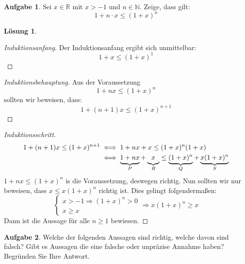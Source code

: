 \documentclass{article}
\theoremstyle{definition}
\newtheorem{ub}{Aufgabe}
\newtheorem*{lo*}{Lösung}
\begin{document}
\newpage
\begin{ub}
	Sei $ x \in \mathbb{R} $  mit $ x > -1 $ und  $ n \in \mathbb{N} $. Zeige, dass gilt:
	\[ 
	1 + n \cdot x \leq (1+x)^n
	 \]
\end{ub}
\begin{tcolorbox}
	\begin{lo*}
		\begin{proof}[Induktionsanfang]
			Der Induktionsanfang ergibt sich unmittelbar:
			\[ 
			1 + x \leq (1 + x)^1
			 \]
		\end{proof}
		\begin{proof}[Induktionsbehauptung]\renewcommand{\qedsymbol}{}
			Aus der Voraussetzung
			\[ 
			1 + nx \leq (1+x)^n
			 \]
			 sollten wir beweisen, dass:
			\[ 
			1 + (n+1)x \leq (1+x)^{n+1}
			 \]\noindent
		\end{proof}
		\begin{proof}[Induktionsschritt]
			\begin{align*}
				1 + (n+1)x \leq (1+x)^{n+1} & \iff 1 + nx + x \leq (1+x)^n(1+x) \\
				& \iff \underbrace{\vphantom{(}1 + nx}_{P} + \underbrace{\vphantom{()} x}_{R} \leq \underbrace{(1+x)^n}_{Q} + \underbrace{x(1+x)^n}_{S}
			\end{align*}
		$ 1 + nx \leq (1+x)^n $ is die Voraussetzung, deswegen richtig. Nun sollten wir nur beweisen, dass $ x \leq x(1+x)^{n} $ richtig ist. Dies gelingt folgendermaßen:
		\[ 
		\left\{
		\begin{array}{ll}
			x > -1 \Rightarrow (1+x)^n > 0 \\
			x \geq x
		\end{array} \Rightarrow x(1+x)^n \geq x
		\right.
		 \]
		Dann ist die Aussage für alle $ n \geq 1 $ bewiesen.
		\end{proof}
	\end{lo*}
\end{tcolorbox}
\newpage
\begin{ub}
	 Welche der folgenden Aussagen sind richtig, welche davon sind falsch? Gibt es
	Aussagen die eine falsche oder unpräzise Annahme haben? Begründen Sie Ihre Antwort.
\end{ub}
\end{document}
